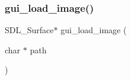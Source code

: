 \mbox{\label{gui_8h_a91b7d91fbed120d172407682412abc27}} 
\subsubsection{gui\+\_\+load\+\_\+image()}
{\footnotesize\ttfamily S\+D\+L\+\_\+\+Surface$\ast$ gui\+\_\+load\+\_\+image (\begin{DoxyParamCaption}\item[{char $\ast$}]{path }\end{DoxyParamCaption})\hspace{0.3cm}{\ttfamily [inline]}}

